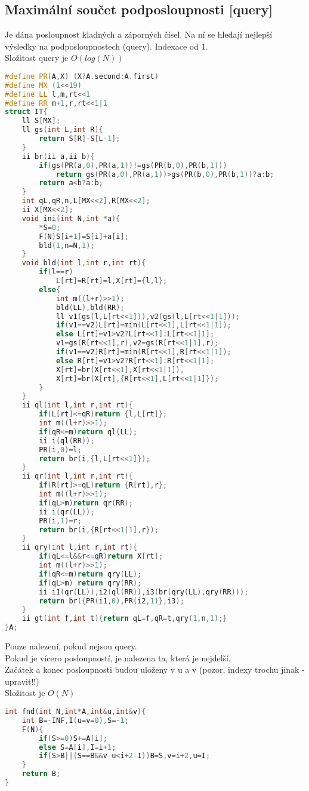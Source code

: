 \documentclass[11pt]{article}
\begin{document}
\subsection{Maximální součet podposloupnosti [query]}
Je dána posloupnost kladných a záporných čísel. Na ní se hledají nejlepší výsledky na podposloupnostech (query). Indexace od 1.
\\Složitost query je $O(log(N))$
\begin{lstlisting}[language=C++]
#define PR(A,X) (X?A.second:A.first)
#define MX (1<<19)
#define LL l,m,rt<<1
#define RR m+1,r,rt<<1|1
struct IT{
    ll S[MX];
    ll gs(int L,int R){
        return S[R]-S[L-1];
    }
    ii br(ii a,ii b){
        if(gs(PR(a,0),PR(a,1))!=gs(PR(b,0),PR(b,1)))
        	return gs(PR(a,0),PR(a,1))>gs(PR(b,0),PR(b,1))?a:b;
        return a<b?a:b;
    }
    int qL,qR,n,L[MX<<2],R[MX<<2];
    ii X[MX<<2];
    void ini(int N,int *a){
        *S=0;
        F(N)S[i+1]=S[i]+a[i];
        bld(1,n=N,1);
    }
    void bld(int l,int r,int rt){
        if(l==r)
            L[rt]=R[rt]=l,X[rt]={l,l};
        else{
            int m((l+r)>>1);
            bld(LL),bld(RR);
            ll v1(gs(l,L[rt<<1])),v2(gs(l,L[rt<<1|1]));
            if(v1==v2)L[rt]=min(L[rt<<1],L[rt<<1|1]);
            else L[rt]=v1>v2?L[rt<<1]:L[rt<<1|1];
            v1=gs(R[rt<<1],r),v2=gs(R[rt<<1|1],r);
            if(v1==v2)R[rt]=min(R[rt<<1],R[rt<<1|1]);
            else R[rt]=v1>v2?R[rt<<1]:R[rt<<1|1];
            X[rt]=br(X[rt<<1],X[rt<<1|1]),
            X[rt]=br(X[rt],{R[rt<<1],L[rt<<1|1]});
        }
    }
    ii ql(int l,int r,int rt){
        if(L[rt]<=qR)return {l,L[rt]};
        int m((l+r)>>1);
        if(qR<=m)return ql(LL);
        ii i(ql(RR));
        PR(i,0)=l;
        return br(i,{l,L[rt<<1]});
    }
    ii qr(int l,int r,int rt){
        if(R[rt]>=qL)return {R[rt],r};
        int m((l+r)>>1);
        if(qL>m)return qr(RR);
        ii i(qr(LL));
        PR(i,1)=r;
        return br(i,{R[rt<<1|1],r});
    }
    ii qry(int l,int r,int rt){
        if(qL<=l&&r<=qR)return X[rt];
        int m((l+r)>>1);
        if(qR<=m)return qry(LL);
        if(qL>m) return qry(RR);
        ii i1(qr(LL)),i2(ql(RR)),i3(br(qry(LL),qry(RR)));
        return br({PR(i1,0),PR(i2,1)},i3);
    }
    ii gt(int f,int t){return qL=f,qR=t,qry(1,n,1);}
}A;
\end{lstlisting}
Pouze nalezení, pokud nejsou query.
\\Pokud je vícero posloupností, je nalezena ta, která je nejdelší.
\\Začátek a konec posloupnosti budou uloženy v \textsf{u} a \textsf{v} (pozor, indexy trochu jinak - upravit!!)
\\Složitost je $O(N)$
\begin{lstlisting}[language=C++]
int fnd(int N,int*A,int&u,int&v){
    int B=-INF,I(u=v=0),S=-1;
    F(N){
        if(S>=0)S+=A[i];
        else S=A[i],I=i+1;
        if(S>B||(S==B&&v-u<i+2-I))B=S,v=i+2,u=I;
    }
    return B;
}
\end{lstlisting}
\end{document}

